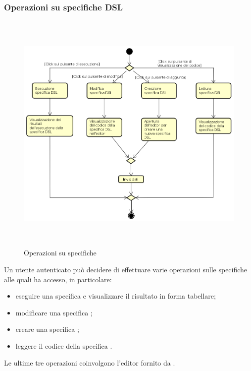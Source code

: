 \subsubsection{Operazioni su specifiche DSL}
\begin{figure}[H]
\begin{center}
\includegraphics[height=12cm]{res/sections/backend/activities/operazioniDSL.png}
\caption{Operazioni su specifiche }
\end{center}
\end{figure}
Un utente autenticato può decidere di effettuare varie operazioni sulle specifiche  alle quali ha accesso, in particolare:
\begin{itemize}
\item eseguire una specifica  e visualizzare il risultato in forma tabellare;
\item modificare una specifica ;
\item creare una specifica ;
\item leggere il codice della specifica .
\end{itemize}
Le ultime tre operazioni coinvolgono l'editor fornito da .
